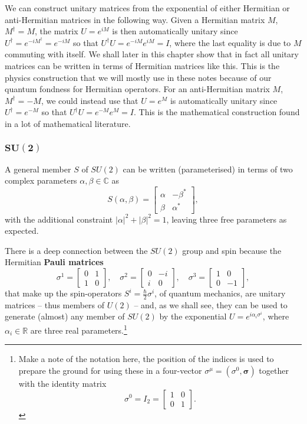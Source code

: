 \documentclass[notes.tex]{subfiles}
\begin{document}
We can construct unitary matrices from the exponential of either Hermitian or anti-Hermitian matrices in the following way. Given a Hermitian matrix $M$, $M^\dagger=M$, the matrix $U=e^{iM}$ is then automatically unitary since $U^\dagger=e^{-iM^\dagger}=e^{-iM}$ so that $U^\dagger U=e^{-iM}e^{iM}=I$, where the last equality is due to $M$ commuting with itself. We shall later in this chapter show that in fact all unitary matrices can be written in terms of Hermitian matrices like this. This is the physics construction that we will mostly use in these notes because of our quantum fondness for Hermitian operators. For an anti-Hermitian matrix $M$, $M^\dagger=-M$, we could instead use that $U=e^M$ is automatically unitary since $U^\dagger=e^{-M}$ so that $U^\dagger U=e^{-M}e^{M}=I$. This is the mathematical construction found in a lot of mathematical literature.

\subsubsection{$\mathbf{SU(2)}$}
A general member $S$ of $SU(2)$ can be written (parameterised) in terms of two complex parameters $\alpha,\beta\in\mathbb{C}$ as
\begin{equation}
S(\alpha,\beta)=\left[
\begin{matrix} \alpha & -\beta^* \\ \beta & \alpha^* \end{matrix}
\right],
\label{eq:SU2_parameterisation}
\end{equation}
with the additional constraint $|\alpha|^2+|\beta|^2=1$, leaving three free parameters as expected. 

There is a deep connection between the $SU(2)$ group and spin because the Hermitian {\bf Pauli matrices} 
\begin{equation}
\sigma^1 =\left[\begin{matrix} 0 & 1 \\ 1 & 0 \end{matrix}\right], 
\quad \sigma^2 =\left[\begin{matrix} 0 & -i \\ i & 0 \end{matrix}\right], 
\quad \sigma^3 =\left[\begin{matrix} 1 & 0 \\ 0 & -1 \end{matrix}\right],
\label{eq:pauli_matrices}
\end{equation}
that make up the spin-operators $S^i=\frac{\hbar}{2}\sigma^i$, of quantum mechanics, are unitary matrices -- thus members of $U(2)$ --  and, as we shall see, they can be used to generate (almost) any member of $SU(2)$ by the exponential $U=e^{i\alpha_i\sigma^i}$, where $\alpha_i\in\mathbb R$ are three real parameters.\footnote{Make a note of the notation here, the position of the indices is used to prepare the ground for using these in a four-vector $\sigma^\mu=(\sigma^0,\boldsymbol{\sigma})$ together with the identity matrix 
\[ \sigma^0=I_2=\left[ \begin{matrix}1 &0  \\ 0 & 1  \end{matrix} \right].\] }
\end{document}
